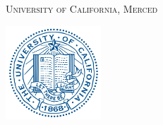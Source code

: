 \documentclass[11pt,twoside,titlepage]{book}
\theoremstyle{plain}
\begin{document}
\frontmatter




\begin{titlepage}

\begin{center}
{\LARGE \textsc{University of California, Merced} } \\
\begin{center}
\includegraphics[height=3.5cm]{logos/uc_logo.jpg}
\end{center}
\vspace{\baselineskip}
\vspace{\baselineskip}


\end{center}
\end{titlepage}
\end{document}
